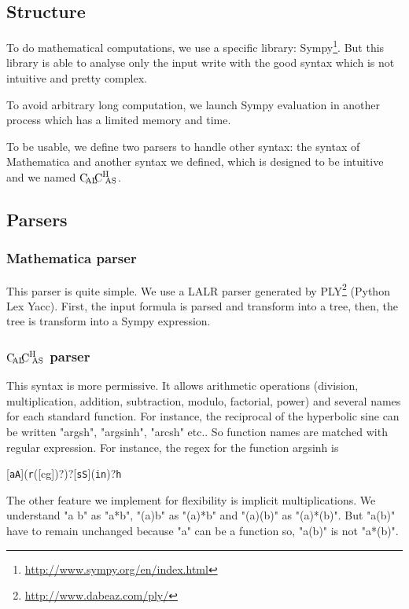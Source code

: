 \subsection{Structure}

To do mathematical computations, we use a specific library: Sympy\footnote{\url{http://www.sympy.org/en/index.html}}. But this library is able to analyse only the input write with the good syntax which is not intuitive and pretty complex.

To avoid arbitrary long computation, we launch Sympy evaluation in another process which has a limited memory and time.

To be usable, we define two parsers to handle other syntax: the syntax of Mathematica and another syntax we defined, which is designed to be intuitive and we named $\text{C}\hspace{-2pt}_{\text{AL}}\hspace{-3pt}\text{C}^{\text{H}}{\hspace{-4pt}}_\text{AS}$.

\subsection{Parsers}

\subsubsection{Mathematica parser}

This parser is quite simple. We use a LALR parser generated by PLY\footnote{\url{http://www.dabeaz.com/ply/}} (Python Lex Yacc). First, the input formula is parsed and transform into a tree, then, the tree is transform into a Sympy expression.

\subsubsection{\texorpdfstring{$\text{C}\hspace{-2pt}_{\text{AL}}\hspace{-3pt}\text{C}^{\text{H}}{\hspace{-4pt}}_\text{AS}$}{CalChAS} parser}

This syntax is more permissive. It allows arithmetic operations (division, multiplication, addition, subtraction, modulo, factorial, power) and several names for each standard function. For instance, the 
reciprocal of the hyperbolic sine can be written "argsh", "argsinh", "arcsh" etc.. So function names are matched with regular expression. For instance, the regex for the function argsinh is \begin{center}[\texttt{aA}](\texttt{r}([cg])?)?[\texttt{sS}](\texttt{in})?\texttt{h}\end{center}

The other feature we implement for flexibility is implicit multiplications. We understand "a b" as "a*b", "(a)b" as "(a)*b" and "(a)(b)" as "(a)*(b)". But "a(b)" have to remain unchanged because "a" can be a function so, "a(b)" is not "a*(b)".

